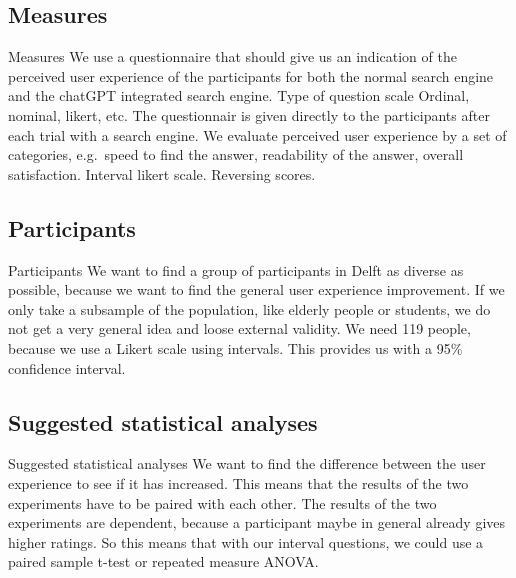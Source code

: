 \documentclass[
  ignorenonframetext,
]{beamer}
\begin{document}
\hypertarget{measures}{%
\subsection{Measures}\label{measures}}

\begin{frame}{Measures}
We use a questionnaire that should give us an indication of the
perceived user experience of the participants for both the normal search
engine and the chatGPT integrated search engine. Type of question scale
Ordinal, nominal, likert, etc. The questionnair is given directly to the
participants after each trial with a search engine. We evaluate
perceived user experience by a set of categories, e.g.~speed to find the
answer, readability of the answer, overall satisfaction. Interval likert
scale. Reversing scores.
\end{frame}

\hypertarget{participants}{%
\subsection{Participants}\label{participants}}

\begin{frame}{Participants}
We want to find a group of participants in Delft as diverse as possible,
because we want to find the general user experience improvement. If we
only take a subsample of the population, like elderly people or
students, we do not get a very general idea and loose external validity.
We need 119 people, because we use a Likert scale using intervals. This
provides us with a 95\% confidence interval.
\end{frame}

\hypertarget{suggested-statistical-analyses}{%
\subsection{Suggested statistical
analyses}\label{suggested-statistical-analyses}}

\begin{frame}{Suggested statistical analyses}
We want to find the difference between the user experience to see if it
has increased. This means that the results of the two experiments have
to be paired with each other. The results of the two experiments are
dependent, because a participant maybe in general already gives higher
ratings. So this means that with our interval questions, we could use a
paired sample t-test or repeated measure ANOVA.
\end{frame}
\end{document}
